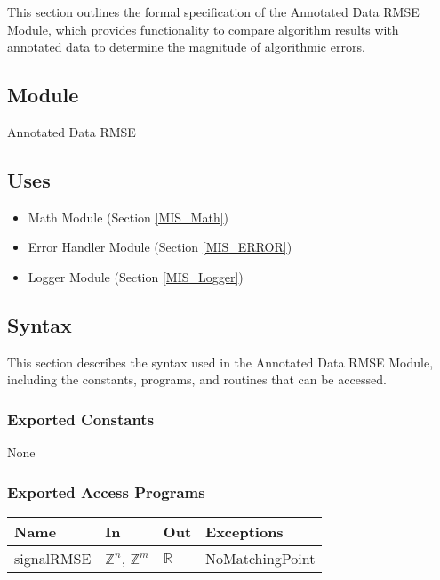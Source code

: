 \documentclass[12pt, titlepage]{article}
\begin{document}
This section outlines the formal specification of the Annotated Data RMSE
Module, which provides functionality to compare algorithm results with annotated
data to determine the magnitude of algorithmic errors.

\subsection{Module}

Annotated Data RMSE

\subsection{Uses}

\begin{itemize}
\item Math Module (Section \ref{MIS_Math})
\item Error Handler Module (Section \ref{MIS_ERROR})
\item Logger Module (Section \ref{MIS_Logger})
\end{itemize}

\subsection{Syntax}

This section describes the syntax used in the Annotated Data RMSE Module,
including the constants, programs, and routines that can be accessed.

\subsubsection{Exported Constants}

None

\subsubsection{Exported Access Programs}

\begin{center}
\begin{tabular}{p{2cm} p{4cm} p{4cm} p{5cm}}
\hline
\textbf{Name} & \textbf{In} & \textbf{Out} & \textbf{Exceptions} \\
\hline
signalRMSE & $\mathbb{Z}^n$, $\mathbb{Z}^m$ & $\mathbb{R}$ & NoMatchingPoint \\
\hline
\end{tabular}
\end{center}
\end{document}
